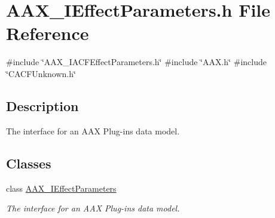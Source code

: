 \hypertarget{a00599}{}\section{A\+A\+X\+\_\+\+I\+Effect\+Parameters.\+h File Reference}
\label{a00599}
{\ttfamily \#include \char`\"{}A\+A\+X\+\_\+\+I\+A\+C\+F\+Effect\+Parameters.\+h\char`\"{}}\newline
{\ttfamily \#include \char`\"{}A\+A\+X.\+h\char`\"{}}\newline
{\ttfamily \#include \char`\"{}C\+A\+C\+F\+Unknown.\+h\char`\"{}}\newline


\subsection{Description}
The interface for an A\+AX Plug-\/in\textquotesingle{}s data model. 

\subsection*{Classes}
\begin{DoxyCompactItemize}
\item 
class \mbox{\hyperlink{a01825}{A\+A\+X\+\_\+\+I\+Effect\+Parameters}}
\begin{DoxyCompactList}\small\item\em The interface for an A\+AX Plug-\/in\textquotesingle{}s data model. \end{DoxyCompactList}\end{DoxyCompactItemize}
